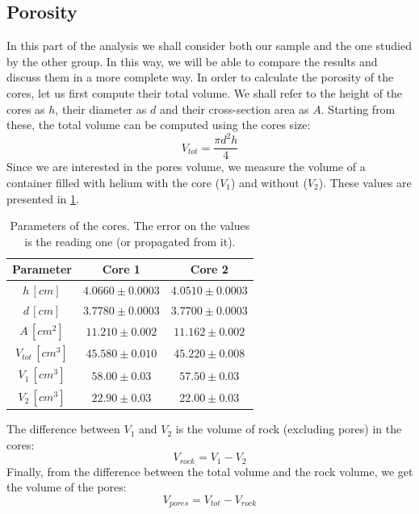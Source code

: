 \documentclass[10pt, a4paper]{amsart}
\begin{document}
\subsection{Porosity}
In this part of the analysis we shall consider both our sample and the one studied by the other group. In this way, we will be able to compare the results and discuss them in a more complete way. In order to calculate the porosity of the cores, let us first compute their total volume. We shall refer to the height of the cores as $h$, their diameter as $d$ and their cross-section area as $A$. Starting from these, the total volume can be computed using the cores size:
\begin{equation}
    V_{tot} = \frac{\pi d^2 h}{4}
\end{equation}
Since we are interested in the pores volume, we measure the volume of a container filled with helium with the core ($V_1$) and without ($V_2$). These values are presented in \cref{tab:CorDim}.
\begin{table}[H]
    \centering
    \begin{tabular}{ccc}
    \toprule
        Parameter & Core 1 & Core 2 \\
    \midrule
        $h \,[cm]$ & $4.0660 \pm 0.0003$ & $4.0510 \pm 0.0003$ \\
        $d \,[cm]$ & $3.7780 \pm 0.0003$ & $3.7700 \pm 0.0003$ \\
        $A \, [cm^2]$ & $11.210 \pm 0.002$ & $11.162 \pm 0.002$ \\
        $V_{tot} \,[cm^3]$ & $45.580 \pm 0.010$ & $45.220 \pm 0.008$ \\
        $V_1\,[cm^3]$ & $58.00 \pm 0.03$ & $57.50 \pm 0.03$\\
        $V_2\,[cm^3]$ & $22.90 \pm 0.03$ & $22.00 \pm 0.03$\\
    \bottomrule
    \end{tabular}
    \caption{Parameters of the cores. The error on the values is the reading one (or propagated from it).}
    \label{tab:CorDim}
\end{table}
The difference between $V_1$ and $V_2$ is the volume of rock (excluding pores) in the cores:
\begin{equation}
    V_{rock} = V_1 - V_2
\end{equation}
Finally, from the difference between the total volume and the rock volume, we get the volume of the pores:
\begin{equation}
    V_{pores} = V_{tot} - V_{rock}
\end{equation}
\end{document}
